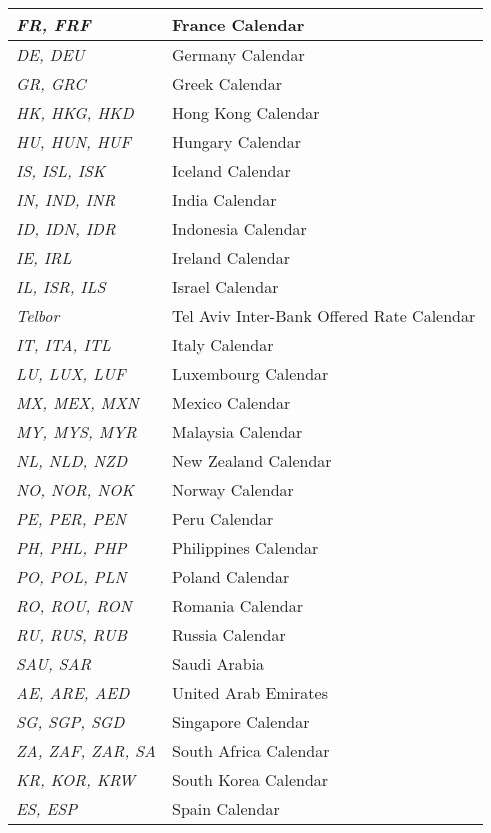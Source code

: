 \begin{longtable}{| p{} | p{} |}
    \emph{FR, FRF} & France Calendar \\ \hline
    \emph{DE, DEU} & Germany Calendar \\ \hline
    \emph{GR, GRC} & Greek Calendar \\ \hline
    \emph{HK, HKG, HKD} & Hong Kong Calendar \\ \hline
    \emph{HU, HUN, HUF} & Hungary Calendar \\ \hline
    \emph{IS, ISL, ISK} & Iceland Calendar \\ \hline
    \emph{IN, IND, INR} & India Calendar \\ \hline
    \emph{ID, IDN, IDR} & Indonesia Calendar \\ \hline
    \emph{IE, IRL} & Ireland Calendar \\ \hline
    \emph{IL, ISR, ILS} & Israel Calendar \\ \hline
    \emph{Telbor} & Tel Aviv Inter-Bank Offered Rate Calendar \\ \hline
    \emph{IT, ITA, ITL} & Italy Calendar \\ \hline
    \emph{LU, LUX, LUF} & Luxembourg Calendar \\ \hline    
    \emph{MX, MEX, MXN} & Mexico Calendar \\ \hline
    \emph{MY, MYS, MYR} & Malaysia Calendar \\ \hline
    \emph{NL, NLD, NZD} & New Zealand Calendar\\ \hline
    \emph{NO, NOR, NOK} & Norway Calendar \\ \hline
    \emph{PE, PER, PEN} & Peru Calendar \\ \hline
    \emph{PH, PHL, PHP} & Philippines Calendar \\ \hline
    \emph{PO, POL, PLN} & Poland Calendar \\ \hline
    \emph{RO, ROU, RON} & Romania Calendar \\ \hline
    \emph{RU, RUS, RUB} & Russia Calendar \\ \hline
    \emph{SAU, SAR} & Saudi Arabia \\ \hline
    \emph{AE, ARE, AED} & United Arab Emirates \\ \hline
    \emph{SG, SGP, SGD} & Singapore Calendar \\ \hline
    \emph{ZA, ZAF, ZAR, SA} & South Africa Calendar \\ \hline    
    \emph{KR, KOR, KRW} & South Korea Calendar \\ \hline
    \emph{ES, ESP} & Spain Calendar \\ \hline

\end{longtable}
